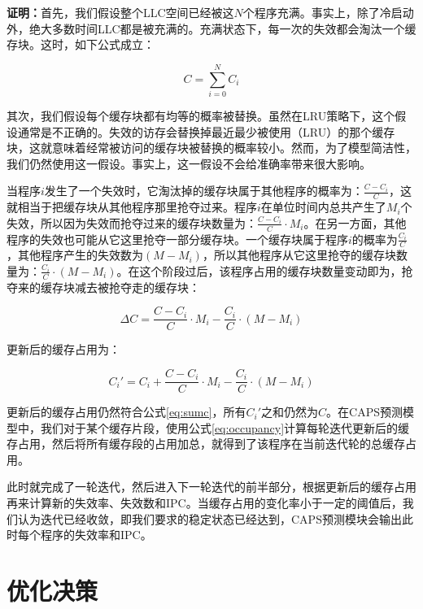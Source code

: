 \textbf{证明：}首先，我们假设整个LLC空间已经被这$N$个程序充满。事实上，除了冷启动外，绝大多数时间LLC都是被充满的。充满状态下，每一次的失效都会淘汰一个缓存块。这时，如下公式成立：

\begin{equation}
C = \sum_{i=0}^{N} C_i
\label{eq:sumc}
\end{equation}

其次，我们假设每个缓存块都有均等的概率被替换。虽然在LRU策略下，这个假设通常是不正确的。失效的访存会替换掉最近最少被使用（LRU）的那个缓存块，这就意味着经常被访问的缓存块被替换的概率较小。然而，为了模型简洁性，我们仍然使用这一假设。事实上，这一假设不会给准确率带来很大影响\parencite{west2010online}。

当程序$i$发生了一个失效时，它淘汰掉的缓存块属于其他程序的概率为：$\frac{C-C_i}{C}$，这就相当于把缓存块从其他程序那里抢夺过来。程序$i$在单位时间内总共产生了$M_i$个失效，所以因为失效而抢夺过来的缓存块数量为：$\frac{C-C_i}{C} \cdot M_i $。在另一方面，其他程序的失效也可能从它这里抢夺一部分缓存块。一个缓存块属于程序$i$的概率为$\frac{C_i}{C}$，其他程序产生的失效数为$(M-M_i)$，所以其他程序从它这里抢夺的缓存块数量为：$\frac{C_i}{C} \cdot (M-M_i)$。在这个阶段过后，该程序占用的缓存块数量变动即为，抢夺来的缓存块减去被抢夺走的缓存块：

\begin{equation}
 \Delta C = \frac{C-C_i}{C} \cdot M_i - \frac{C_i}{C} \cdot (M-M_i)
 \label{eq:deltac}
\end{equation}

更新后的缓存占用为：

\begin{equation}
 C_i' = C_i + \frac{C-C_i}{C} \cdot M_i - \frac{C_i}{C} \cdot (M-M_i)
 \label{eq:occupancy}
\end{equation}

更新后的缓存占用仍然符合公式\ref{eq:sumc}，所有$C_i'$之和仍然为$C$。在CAPS预测模型中，我们对于某个缓存片段，使用公式\ref{eq:occupancy}计算每轮迭代更新后的缓存占用，然后将所有缓存段的占用加总，就得到了该程序在当前迭代轮的总缓存占用。

此时就完成了一轮迭代，然后进入下一轮迭代的前半部分，根据更新后的缓存占用再来计算新的失效率、失效数和IPC。当缓存占用的变化率小于一定的阈值后，我们认为迭代已经收敛，即我们要求的稳定状态已经达到，CAPS预测模块会输出此时每个程序的失效率和IPC。

\section{优化决策} \label{sec:allocation}

